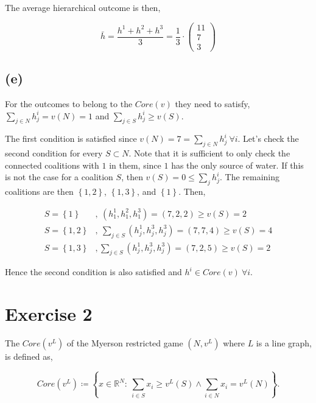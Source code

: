 \documentclass[american]{scrartcl}
\newcommand{\set}[1]{\left\{#1\right\}}
\newcommand{\Real}{\mathbb{R}}
\begin{document}
The average hierarchical outcome is then,

\begin{equation}
    \bar{h} = \frac{h^1 + h^2 + h^3}{3} = \frac{1}{3} \cdot \begin{pmatrix}
        11 \\ 7 \\3
    \end{pmatrix}
\end{equation}

\subsection*{(e)}

For the outcomes to belong to the $Core(v)$ they need to satisfy, $\sum_{j \in N} h_j^i = v(N) = 1$ and $\sum_{j \in S}  h_j^i \geq v(S)$.

The first condition is satisfied since $v(N) = 7 = \sum_{j \in N} h_j^i \ \forall i$. Let's check the second condition for every $S \subset N$. Note that it is sufficient to only check the connected coalitions with $1$ in them, since $1$ has the only source of water. If this is not the case for a coalition $S$, then $v(S) = 0 \leq \sum_{j} h_j^i$. The remaining coalitions are then $\set{1, 2}$, $\set{1, 3}$, and $\set{1}$. Then,

\begin{equation}
    \begin{split}
        S = \set{1}&, \ (h^1_1, h^2_1, h^3_1) = (7, 2, 2) \geq v(S) = 2 \\
        S = \set{1, 2}&, \ \sum_{j \in S} (h^1_j, h^3_j, h^3_j) = (7, 7, 4) \geq v(S) = 4 \\
        S = \set{1, 3}&, \sum_{j \in S} (h^1_j, h^3_j, h^3_j) = (7, 2, 5) \geq v(S) = 2
    \end{split}
\end{equation}


Hence the second condition is also satisfied and $h^i \in Core(v) \ \forall i$.

\section*{Exercise 2}

The $Core(v^L)$ of the Myerson restricted game $(N, v^L)$ where $L$ is a line graph, is defined as,

\begin{equation}
    Core(v^L) \coloneqq \set{x \in \Real^N: \ \sum_{i \in S} x_i \geq v^L(S) \land \sum_{i \in N} x_i = v^L(N)}.
\end{equation}
\end{document}
